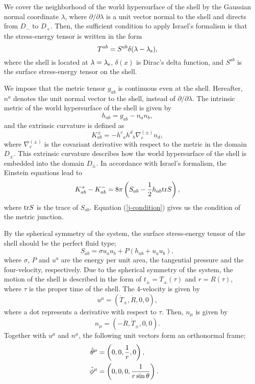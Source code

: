 \documentclass[aps,preprint,preprintnumber,nofootinbib,amsmath,amssymb,ascmac,bm,12pt]{revtex4}
\newcommand{\thetah}{\hat{\theta}}
\newcommand{\phih}{\hat{\phi}}
\begin{document}
We cover the neighborhood of the world hypersurface of the shell by the Gaussian normal coordinate $\lambda$, 
where $\partial/\partial\lambda$ is a 
unit vector normal to the shell and directs from 
$D_-$ to $D_+$. Then, the sufficient condition 
to apply Israel's formalism is that the stress-energy tensor is written in the form
$$
T^{ab}=S^{ab}\delta(\lambda-\lambda_{\rm s}),
$$
where the shell is located at $\lambda=\lambda_{\rm s}$, $\delta(x)$ is Dirac's delta function, 
and $S^{ab}$ is the surface stress-energy tensor on the shell. 

We impose that the metric tensor $g_{ab}$ is continuous even at the shell. 
Hereafter, $n^a$ denotes the unit normal vector to the shell, 
instead of $\partial/\partial \lambda$. 
The intrinsic metric of the world hypersurface of the shell is given by
$$
h_{ab}=g_{ab}-n_a n_b,
$$
and the extrinsic curvature is defined as
$$
K^{\pm}_{ab}=-h^{c}{}_a h^{d}{}_b \nabla^{(\pm)}_c n_d,
$$
where $\nabla^{(\pm)}_c$ is the covariant derivative with respect to the metric in the 
domain $D_\pm$. This extrinsic curvature describes how the world hypersurface of the shell 
is embedded into the domain $D_\pm$. In accordance with Israel's formalism, the Einstein equations lead to
\begin{equation}
K^{+}_{ab}-K^{-}_{ab}=8\pi\left(S_{ab}-\frac{1}{2}h_{ab}{\rm tr}S\right),
\label{j-condition}
\end{equation}
where ${\rm tr}S$ is the trace of $S_{ab}$.  Equation (\ref{j-condition}) gives us the condition 
of the metric junction. 

By the spherical symmetry of the system, the surface stress-energy tensor of the shell 
should be the perfect fluid type; 
$$
S_{ab}=\sigma u_a u_b+P\left(h_{ab}+u_a u_b\right),
$$
where $\sigma$, $P$ and $u^a$ are the energy per unit area, the tangential pressure and the four-velocity, respectively. 
Due to the spherical symmetry of the system, 
the motion of the shell is described in the form of $t_\pm=T_\pm(\tau)$ and 
$r=R(\tau)$, where $\tau$ is the proper time of the shell.  
The 4-velocity is given by 
$$
u^\mu=\left(\dot{T}_{\pm},\dot{R},0,0\right),
$$
where a dot represents a derivative with respect to $\tau$. 
Then, $n_\mu$ is given by
$$
n_\mu=\left(-\dot{R},\dot{T}_{\pm},0,0\right).
$$
Together with $u^\mu$ and $n^\mu$, the following unit vectors form an orthonormal frame;
\begin{align}
\thetah^\mu&=\left(0,0,\frac{1}{r},0\right), \cr
\phih^\mu&=\left(0,0,0,\frac{1}{r\sin\theta}\right). \nonumber
\end{align}
\end{document}
